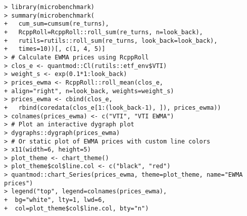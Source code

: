 \documentclass[10pt]{beamer}\usepackage[]{graphicx}\usepackage[]{color}
\makeatletter
\newenvironment{kframe}{%
 \def\at@end@of@kframe{}%
 \ifinner\ifhmode%
  \def\at@end@of@kframe{\end{minipage}}%
  \begin{minipage}{\columnwidth}%
 \fi\fi%
 \def\FrameCommand##1{\hskip\@totalleftmargin \hskip-\fboxsep
 \colorbox{shadecolor}{##1}\hskip-\fboxsep
     \hskip-\linewidth \hskip-\@totalleftmargin \hskip\columnwidth}%
 \MakeFramed {\advance\hsize-\width
   \@totalleftmargin\z@ \linewidth\hsize
   \@setminipage}}%
 {\par\unskip\endMakeFramed%
 \at@end@of@kframe}
\newenvironment{knitrout}{}{} %
\makeatother
\begin{document}
\begin{frame}[fragile,t]{\subsecname}
\begin{block}{}
\begin{columns}[T]
\begin{knitrout}
\begin{kframe}
\begin{verbatim}
> library(microbenchmark)
> summary(microbenchmark(
+   cum_sum=cumsum(re_turns),
+   RcppRoll=RcppRoll::roll_sum(re_turns, n=look_back),
+   rutils=rutils::roll_sum(re_turns, look_back=look_back),
+   times=10))[, c(1, 4, 5)]
> # Calculate EWMA prices using RcppRoll
> clos_e <- quantmod::Cl(rutils::etf_env$VTI)
> weight_s <- exp(0.1*1:look_back)
> prices_ewma <- RcppRoll::roll_mean(clos_e,
+ align="right", n=look_back, weights=weight_s)
> prices_ewma <- cbind(clos_e,
+   rbind(coredata(clos_e[1:(look_back-1), ]), prices_ewma))
> colnames(prices_ewma) <- c("VTI", "VTI EWMA")
> # Plot an interactive dygraph plot
> dygraphs::dygraph(prices_ewma)
> # Or static plot of EWMA prices with custom line colors
> x11(width=6, height=5)
> plot_theme <- chart_theme()
> plot_theme$col$line.col <- c("black", "red")
> quantmod::chart_Series(prices_ewma, theme=plot_theme, name="EWMA prices")
> legend("top", legend=colnames(prices_ewma),
+  bg="white", lty=1, lwd=6,
+  col=plot_theme$col$line.col, bty="n")
\end{verbatim}
\end{kframe}
\end{knitrout}
  \end{columns}
\end{block}

\end{frame}


\end{document}
